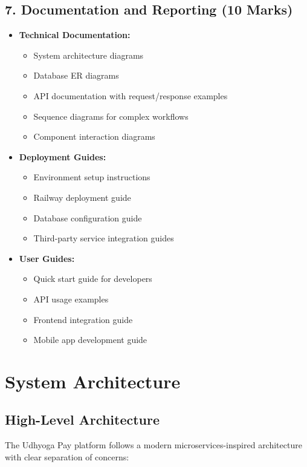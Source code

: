 \documentclass[12pt,a4paper]{article}
\begin{document}
\subsection*{7. Documentation and Reporting (10 Marks)}
\begin{itemize}[leftmargin=*]
    \item \textbf{Technical Documentation:}
    \begin{itemize}
        \item System architecture diagrams
        \item Database ER diagrams
        \item API documentation with request/response examples
        \item Sequence diagrams for complex workflows
        \item Component interaction diagrams
    \end{itemize}
    \item \textbf{Deployment Guides:}
    \begin{itemize}
        \item Environment setup instructions
        \item Railway deployment guide
        \item Database configuration guide
        \item Third-party service integration guides
    \end{itemize}
    \item \textbf{User Guides:}
    \begin{itemize}
        \item Quick start guide for developers
        \item API usage examples
        \item Frontend integration guide
        \item Mobile app development guide
    \end{itemize}
\end{itemize}

\newpage

\section*{System Architecture}

\subsection*{High-Level Architecture}
The Udhyoga Pay platform follows a modern microservices-inspired architecture with clear separation of concerns:
\end{document}
